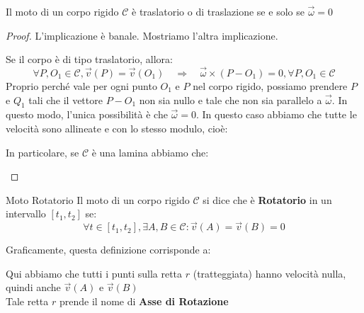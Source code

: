 \documentclass[11pt,a4paper,twoside]{article}
\theoremstyle{definition}
\begin{document}
\begin{prop}{}{}
	Il moto di un corpo rigido $\mathscr C$ è traslatorio o di traslazione se e solo se $\vec \omega = 0$
\end{prop}

\begin{proof}
	L'implicazione \fbox {$\Leftarrow$} è banale. Mostriamo l'altra implicazione.

	\fbox {$\Rightarrow$} Se il corpo è di tipo traslatorio, allora:
	\[ \forall P, O_1 \in \mathscr C, \vec v(P) = \vec v(O_1) \quad \Rightarrow \quad \vec \omega \times (P-O_1) = 0, \forall P,O_1 \in \mathscr C\]
	Proprio perché vale per ogni punto $O_1$ e $P$ nel corpo rigido, possiamo prendere $P$ e $Q_1$ tali che il vettore $P-O_1$ non sia nullo e tale che non sia parallelo a $\vec \omega$. In questo modo, l'unica possibilità è che $\vec \omega = 0$. In questo caso abbiamo che tutte le velocità sono allineate e con lo stesso modulo, cioè:
	\begin{center}
	\end{center}
	In particolare, se $\mathscr C$ è una lamina abbiamo che:
	\begin{center}
	\end{center}
\end{proof}

\begin{defn}{Moto Rotatorio}{}
	Il moto di un corpo rigido $\mathscr C$ si dice che è \textbf{Rotatorio} in un intervallo $[t_1,t_2]$ se:
	\[ \forall t \in [t_1,t_2], \exists A, B \in \mathscr C : \vec v(A) = \vec v(B) = 0 \]
\end{defn}

Graficamente, questa definizione corrisponde a:
\begin{center}
\end{center}
Qui abbiamo che tutti i punti sulla retta $r$ (tratteggiata) hanno velocità nulla, quindi anche $\vec v(A)$ e $\vec v(B)$\\
Tale retta $r$ prende il nome di \textbf{Asse di Rotazione}
\end{document}
